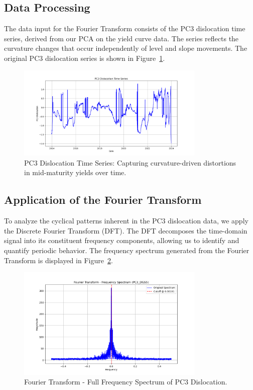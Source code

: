 \documentclass[12pt]{article}
\begin{document}
\subsection{Data Processing}
The data input for the Fourier Transform consists of the PC3 dislocation time series, derived from our PCA on the yield curve data. The series reflects the curvature changes that occur independently of level and slope movements. The original PC3 dislocation series is shown in Figure~\ref{fig:pc3dislocation}.

\begin{figure}[H]
    \centering
    \includegraphics[width=0.8\textwidth]{visuals/pc3_dislocation_timeseries.png}
    \caption{PC3 Dislocation Time Series: Capturing curvature-driven distortions in mid-maturity yields over time.}
    \label{fig:pc3dislocation}
\end{figure}

\subsection{Application of the Fourier Transform}
To analyze the cyclical patterns inherent in the PC3 dislocation data, we apply the Discrete Fourier Transform (DFT). The DFT decomposes the time-domain signal into its constituent frequency components, allowing us to identify and quantify periodic behavior. The frequency spectrum generated from the Fourier Transform is displayed in Figure~\ref{fig:fullspectrum}.

\begin{figure}[H]
    \centering
    \includegraphics[width=0.8\textwidth]{visuals/fourier_full_spectrum.png}
    \caption{Fourier Transform - Full Frequency Spectrum of PC3 Dislocation.}
    \label{fig:fullspectrum}
\end{figure}
\end{document}
